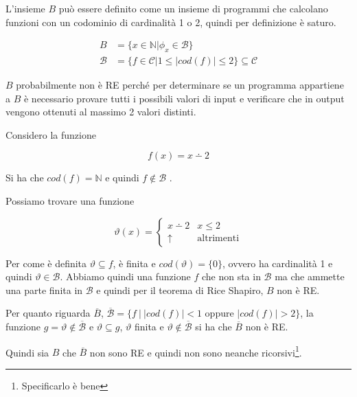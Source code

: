 L'insieme $B$ può essere definito come un insieme di programmi che calcolano funzioni con un codominio di cardinalità 1 o 2, quindi per definizione è saturo.

\begin{align*}
	B &= \{ x \in \mathbb{N} | \phi_x \in \mathcal{B} \} \\
	\mathcal{B} &= \{ f \in \mathcal{C} | 1 \leq |cod(f) | \leq 2 \} \subseteq \mathcal{C}
\end{align*}

$B$ probabilmente non è RE perché per determinare se un programma appartiene a $B$ è necessario provare tutti i possibili valori di input e verificare che in output vengono ottenuti al massimo 2 valori distinti.

Considero la funzione 

$$
f(x) = x \dotminus 2
$$

Si ha che $cod(f) = \mathbb{N}$ e quindi $f \notin \mathcal{B}$ .

Possiamo trovare una funzione

$$
\vartheta(x) = \begin{cases}
	x \dotminus 2 &x \leq 2 \\
	\uparrow &\text{altrimenti}
\end{cases}
$$

Per come è definita $\vartheta \subseteq f$, è finita e $cod(\vartheta) = \{0\}$, ovvero ha cardinalità 1 e quindi $\vartheta \in \mathcal{B}$. Abbiamo quindi una funzione $f$ che non sta in $\mathcal{B}$ ma che ammette una parte finita in $\mathcal{B}$ e quindi per il teorema di Rice Shapiro, $B$ non è RE.

Per quanto riguarda $\overline{B}$, $\overline{\mathcal{B}} = \{ f \:|\: |cod(f)| < 1 \text{ oppure } |cod(f)| > 2 \}$, la funzione $g = \vartheta \notin \overline{\mathcal{B}}$ e $\vartheta \subseteq g$, $\vartheta$ finita e $\vartheta \notin \overline{\mathcal{B}}$ si ha che $\overline{B}$ non è RE.

Quindi sia $B$ che $\overline{B}$ non sono RE e quindi non sono neanche ricorsivi\footnote{Specificarlo è bene}.

